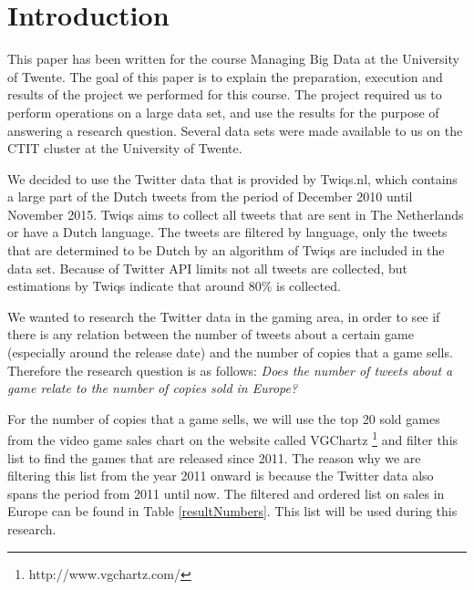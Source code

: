\section{Introduction}
This paper has been written for the course Managing Big Data at the University of Twente. The goal of this paper is to explain the preparation, execution and results of the project we performed for this course. The project required us to perform operations on a large data set, and use the results for the purpose of answering a research question. Several data sets were made available to us on the CTIT cluster at the University of Twente. 

We decided to use the Twitter data that is provided by Twiqs.nl, which contains a large part of the Dutch tweets from the period of December 2010 until November 2015. Twiqs aims to collect all tweets that are sent in The Netherlands or have a Dutch language. The tweets are filtered by language, only the tweets that are determined to be Dutch by an algorithm of Twiqs are included in the data set. Because of Twitter API limits not all tweets are collected, but estimations by Twiqs indicate that around 80\% is collected.

We wanted to research the Twitter data in the gaming area, in order to see if there is any relation between the number of tweets about a certain game (especially around the release date) and the number of copies that a game sells. Therefore the research question is as follows:
\textit{Does the number of tweets about a game relate to the number of copies sold in Europe?}

For the number of copies that a game sells, we will use the top 20 sold games from the video game sales chart on the website called VGChartz \footnote{http://www.vgchartz.com/} and filter this list to find the games that are released since 2011. The reason why we are filtering this list from the year 2011 onward is because the Twitter data also spans the period from 2011 until now. The filtered and ordered list on sales in Europe can be found in Table \ref{resultNumbers}. This list will be used during this research.

